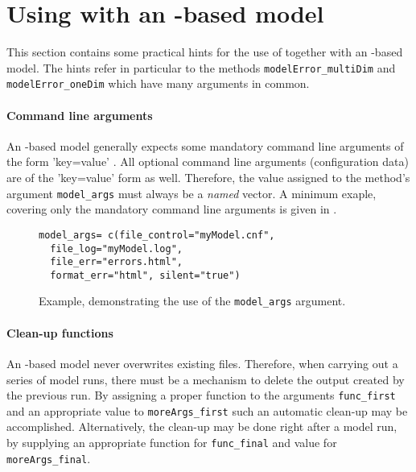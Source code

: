 \section{Using  with an -based model} \label{sec:mops:echse}

This section contains some practical hints for the use of  together with an -based model. The hints refer in particular to the methods \texttt{modelError\_multiDim} and \texttt{modelError\_oneDim} which have many arguments in common.

\paragraph{Command line arguments} An -based model generally expects some mandatory command line arguments of the form 'key=value' \citep[see][for details]{Echse-Main-Doc}. All optional command line arguments (configuration data) are of the 'key=value' form as well. Therefore, the value assigned to the method's argument \texttt{model\_args} must always be a \emph{named} vector. A minimum exaple, covering only the mandatory command line arguments is given in .

\begin{figure}
\begin{lstlisting}[style=R]
model_args= c(file_control="myModel.cnf",
  file_log="myModel.log",
  file_err="errors.html",
  format_err="html", silent="true")
\end{lstlisting}
\caption{Example, demonstrating the use of the \texttt{model\_args} argument. \label{fig:mops:echse:cmdArgs}}
\end{figure}

\paragraph{Clean-up functions} An -based model never overwrites existing files. Therefore, when carrying out a series of model runs, there must be a mechanism to delete the output created by the previous run. By assigning a proper function to the arguments \texttt{func\_first} and an appropriate value to \texttt{moreArgs\_first} such an automatic clean-up may be accomplished. Alternatively, the clean-up may be done right after a model run, by supplying an appropriate function for \texttt{func\_final} and value for \texttt{moreArgs\_final}.

